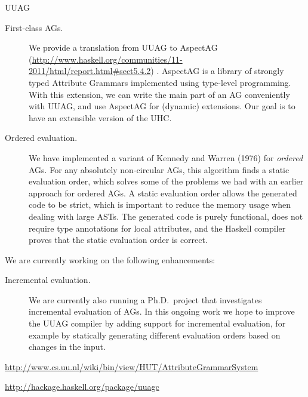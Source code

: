 \begin{hcarentry}[updated]{UUAG}
\begin{description}
\item[First-class AGs.]
  We provide a translation from UUAG to AspectAG (\url{http://www.haskell.org/communities/11-2011/html/report.html#sect5.4.2})%
  .
  AspectAG is a library of strongly typed Attribute Grammars
  implemented using type-level programming. With this extension, we can write the main part of
  an AG conveniently with UUAG, and use AspectAG for (dynamic) extensions. Our goal is to have
  an extensible version of the UHC.

\item[Ordered evaluation.]
  We have implemented a variant of Kennedy and Warren (1976)
  for \emph{ordered} AGs. For any absolutely non-circular AGs, this algorithm finds a static
  evaluation order, which solves some of the problems we had with an earlier approach for
  ordered AGs. A static evaluation order allows the generated code to be strict, which is
  important to reduce the memory usage when dealing with large ASTs.
  The generated code is purely functional, does not require type
  annotations for local attributes, and the Haskell compiler proves that the static evaluation
  order is correct.
\end{description}

We are currently working on the following enhancements:
\begin{description}
\item[Incremental evaluation.]
  We are currently also running a Ph.D.\ project that investigates incremental evaluation of
  AGs. In this ongoing work we hope to improve the UUAG compiler by adding support for
  incremental evaluation, for example by statically generating different evaluation orders
  based on changes in the input.
\end{description}

\FurtherReading
\begin{compactitem}
\item
  \url{http://www.cs.uu.nl/wiki/bin/view/HUT/AttributeGrammarSystem}
\item
  \url{http://hackage.haskell.org/package/uuagc}
\end{compactitem}
\end{hcarentry}
